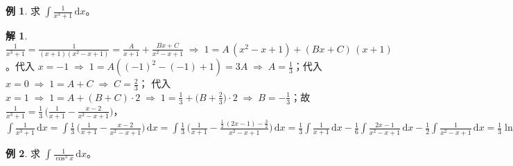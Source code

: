 \documentclass[12pt]{extarticle}
\newcommand{\ds}{\displaystyle}
\newcommand{\ie}{\;\Longrightarrow\;}
\theoremstyle{definition}
\newtheorem*{ex}{例}
\newtheorem*{sol}{解}
\begin{document}
\begin{ex}
  求 $\ds\int\!\frac{1}{x^3 + 1}\,\text{d}x$。
\end{ex}

\begin{sol}
  $\ds\frac{1}{x^3 + 1} = \frac{1}{(x + 1)(x^2 - x + 1)} = \frac{A}{x + 1} + \frac{B x + C}{x^2 - x + 1} \ie 1 = A\,(x^2 - x + 1) + (B x + C)\,(x + 1)$。代入 $\ds x = -1\ie 1 = A((-1)^2 - (-1) + 1) = 3A \ie A = \frac{1}{3}$；代入 $\ds x = 0\ie 1 = A + C \ie C = \frac{2}{3}$； 代入 $\ds x = 1\ie 1 = A + (B + C)\cdot 2 \ie 1 = \frac{1}{3} + \Big(B + \frac{2}{3}\Big)\cdot 2 \ie B = -\frac{1}{3}$；故 $\ds\frac{1}{x^3 + 1} = \frac{1}{3}\,\bigg(\frac{1}{x + 1} - \frac{x - 2}{x^2 - x + 1}\bigg)$，$\ds\int\!\frac{1}{x^3 + 1}\,\text{d}x = \int\!\frac{1}{3}\,\bigg(\frac{1}{x + 1} - \frac{x - 2}{x^2 - x + 1}\bigg)\,\text{d}x = \int\!\frac{1}{3}\,\bigg(\frac{1}{x + 1} - \frac{\frac{1}{2}\,(2x - 1) - \frac{3}{2}}{x^2 - x + 1}\bigg)\,\text{d}x = \frac{1}{3}\int\!\frac{1}{x + 1}\,\text{d}x - \frac{1}{6}\int\!\frac{2x - 1}{x^2 - x + 1}\,\text{d}x - \frac{1}{2}\int\!\frac{1}{x^2 - x + 1}\,\text{d}x = \frac{1}{3}\ln|x + 1| - \frac{1}{6}\ln(x^2 - x + 1) - \frac{1}{\sqrt{3}}\tan^{-1}\frac{2x - 1}{\sqrt{3}}$
\end{sol}

\begin{ex}
  求 $\ds\int\!\frac{1}{\cos^3 x}\,\text{d}x$。
\end{ex}
\end{document}
